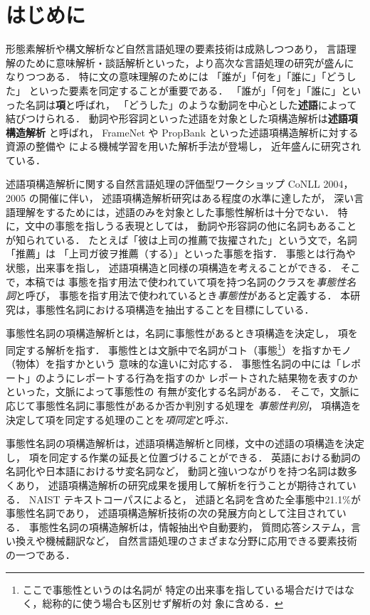 \documentclass[japanese]{jnlp_1.4}
\begin{document}
\maketitle


\section{はじめに}
\label{sec:introduction}

形態素解析や構文解析など自然言語処理の要素技術は成熟しつつあり，
言語理解のために意味解析・談話解析といった，より高次な言語処理の研究が盛んに
なりつつある．
特に文の意味理解のためには
「誰が」「何を」「誰に」「どうした」
といった要素を同定することが重要である．
「誰が」「何を」「誰に」といった名詞は\textbf{項}と呼ばれ，
「どうした」のような動詞を中心とした\textbf{述語}によって結びつけられる．
動詞や形容詞といった述語を対象とした項構造解析は\textbf{述語項構造解析}
と呼ばれ，
FrameNet や PropBank といった述語項構造解析に対する資源の整備や
\cite{gildea:2002:CL} による機械学習を用いた解析手法が登場し，
近年盛んに研究されている．

述語項構造解析に関する自然言語処理の評価型ワークショップ
CoNLL 2004，2005 の開催に伴い，
述語項構造解析研究はある程度の水準に達したが，
深い言語理解をするためには，述語のみを対象とした事態性解析は十分でない．
特に，文中の事態を指しうる表現としては，
動詞や形容詞の他に名詞もあることが知られている\cite{grimshaw:1990}．
たとえば「彼は上司の推薦で抜擢された」という文で，名詞「推薦」は
「上司ガ彼ヲ推薦（する）」といった事態を指す．
事態とは行為や状態，出来事を指し，
述語項構造と同様の項構造を考えることができる．
そこで，本稿では
事態を指す用法で使われていて項を持つ名詞のクラスを\emph{事態性名詞}と呼び，
事態を指す用法で使われているとき\emph{事態性}があると定義する．
本研究は，事態性名詞における項構造を抽出することを目標にしている．

事態性名詞の項構造解析とは，名詞に事態性があるとき項構造を決定し，
項を同定する解析を指す．
事態性とは文脈中で名詞がコト（事態\footnote{ここで事態性というのは名詞が
特定の出来事を指している場合だけではなく，総称的に使う場合も区別せず解析の対
象に含める．}）を指すかモノ（物体）を指すかという
意味的な違いに対応する．
事態性名詞の中には「レポート」のようにレポートする行為を指すのか
レポートされた結果物を表すのかといった，文脈によって事態性の
有無が変化する名詞がある．
そこで，文脈に応じて事態性名詞に事態性があるか否か判別する処理を
\emph{事態性判別}，
項構造を決定して項を同定する処理のことを\emph{項同定}と呼ぶ．

事態性名詞の項構造解析は，述語項構造解析と同様，文中の述語の項構造を決定し，
項を同定する作業の延長と位置づけることができる．
英語における動詞の名詞化や日本語におけるサ変名詞など，
動詞と強いつながりを持つ名詞は数多くあり，
述語項構造解析の研究成果を援用して解析を行うことが期待されている．
NAIST テキストコーパス\cite{iida:2007:NL}によると，
述語と名詞を含めた全事態中21.1\%が事態性名詞であり，
述語項構造解析技術の次の発展方向として注目されている．
事態性名詞の項構造解析は，情報抽出や自動要約，
質問応答システム，言い換えや機械翻訳など，
自然言語処理のさまざまな分野に応用できる要素技術の一つである．
\end{document}
